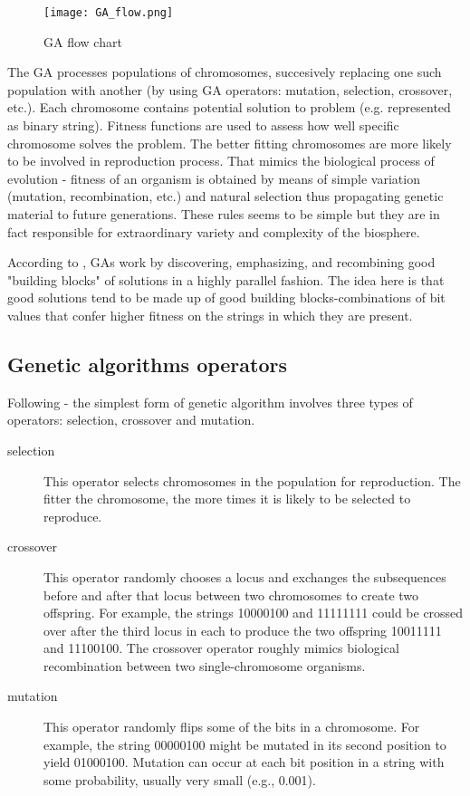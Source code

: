 \begin{figure}[ht]
  \begin{center}
    \texttt{[image: GA\_flow.png]}
  \end{center}
  \caption{GA flow chart \cite{Haupt:2004:PGA:1007746}}
\end{figure}

The GA processes populations of chromosomes, succesively replacing one such population with another (by using GA operators: mutation, selection, crossover, etc.). 
Each chromosome contains potential solution to problem (e.g. represented as binary string). 
Fitness functions are used to assess how well specific chromosome solves the problem.
The better fitting chromosomes are more likely to be involved in reproduction process.
That mimics the biological process of evolution - fitness of an organism is obtained by means of simple variation (mutation, recombination, etc.) and natural selection
thus propagating genetic material to future generations.
These rules seems to be simple but they are in fact responsible for extraordinary variety and complexity of the biosphere.
\cite{Mitchell01} 
 
According to \cite{Mitchell01} , GAs work by discovering, emphasizing, and recombining good "building blocks" of solutions in a highly parallel fashion.
The idea here is that good solutions tend to be made up of good building blocks-combinations of bit values that confer higher fitness on the strings in which they are present.

 

\subsection{Genetic algorithms operators}

Following \cite{Mitchell01} - the simplest form of genetic algorithm involves three types of operators: selection, crossover and mutation. 

\begin{description}

\item[selection]
  This operator selects chromosomes in the population for reproduction.
  The fitter the chromosome, the more times it is likely to be selected to reproduce.
  
\item[crossover]
  This operator randomly chooses a locus and exchanges the subsequences before and after that locus between two chromosomes to create two offspring.
  For example, the strings 10000100 and 11111111 could be crossed over after the third locus in each to produce the two offspring 10011111 and 11100100.
  The crossover operator roughly mimics biological recombination between two single-chromosome organisms.

\item[mutation]
  This operator randomly flips some of the bits in a chromosome.
  For example, the string 00000100 might be mutated in its second position to yield 01000100.
  Mutation can occur at each bit position in a string with some probability, usually very small (e.g., 0.001).


\end{description}

